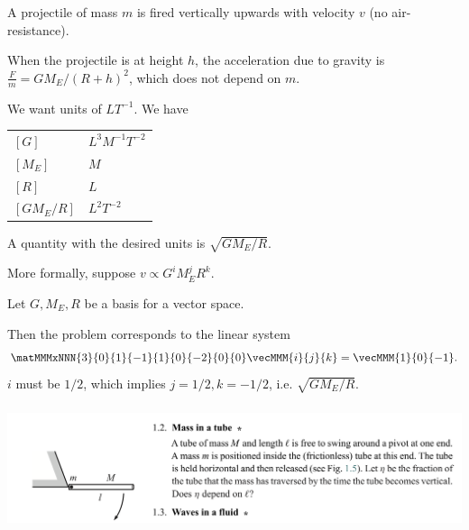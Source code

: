 A projectile of mass $m$ is fired vertically upwards with velocity $v$ (no air-resistance).

When the projectile is at height $h$, the acceleration due to gravity is
$\frac{F}{m} = GM_E/(R + h)^2$, which does not depend on $m$.

We want units of $LT^{-1}$. We have

\begin{tabular*}{1.0\linewidth}{l|l}
  $[G]$        & $L^3M^{-1}T^{-2}$ \\
  $[M_E]$      & $M$ \\
  $[R]$        & $L$ \\
  $[GM_E / R]$ & $L^2T^{-2}$
\end{tabular*}

A quantity with the desired units is $\sqrt{GM_E/R}$.

More formally, suppose $v \propto G^iM_E^jR^k$.

Let  ${G, M_E, R}$ be a basis for a vector space.

Then the problem corresponds to the linear system
\begin{align*}
  \matMMMxNNN
  {3}{0}{1}
  {-1}{1}{0}
  {-2}{0}{0} \vecMMM{i}{j}{k} = \vecMMM{1}{0}{-1}.
\end{align*}
$i$ must be $1/2$, which implies $j = 1/2, k = -1/2$, i.e. $\sqrt{GM_E/R}$. \checkmark

\subsubsection*{}
\begin{mdframed}
  \includegraphics[width=400pt]{img/physics--classical-mechanics--morin--1-2.png}
\end{mdframed}

